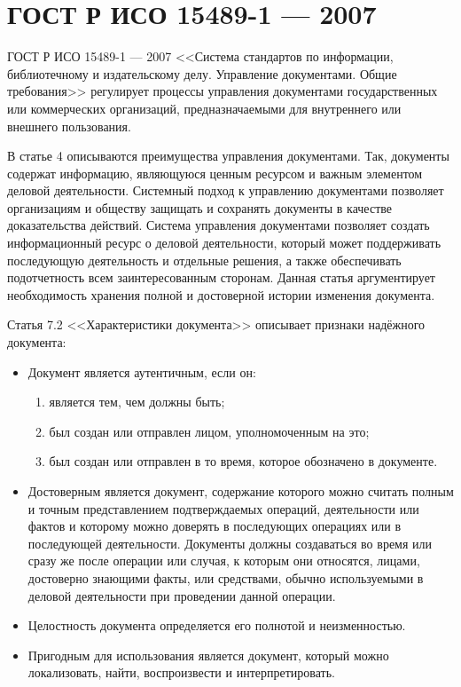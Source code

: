 \section{ГОСТ Р ИСО 15489-1 --- 2007} \label{rights_gost_15489-1}

ГОСТ Р ИСО 15489-1 --- 2007 <<Система стандартов по информации, библиотечному и издательскому делу. Управление документами. Общие требования>> регулирует процессы управления документами государственных или коммерческих организаций, предназначаемыми для внутреннего или внешнего пользования.

В статье 4 описываются преимущества управления документами. Так, документы содержат информацию, являющуюся ценным ресурсом и важным элементом деловой деятельности. Системный подход к управлению документами позволяет организациям и обществу защищать и сохранять документы в качестве доказательства действий. Система управления документами позволяет создать информационный ресурс о деловой деятельности, который может поддерживать последующую деятельность и отдельные решения, а также обеспечивать подотчетность всем заинтересованным сторонам. Данная статья аргументирует необходимость хранения полной и достоверной истории изменения документа.

Статья 7.2 <<Характеристики документа>> описывает признаки надёжного документа:
\begin{itemize}
	\item Документ является аутентичным, если он:
	\begin{enumerate}
	\item является тем, чем должны быть;
	\item был создан или отправлен лицом, уполномоченным на это;
	\item был создан или отправлен в то время, которое обозначено в документе.
	\end{enumerate}
	\item Достоверным является документ, содержание которого можно считать полным и точным представлением подтверждаемых операций, деятельности или фактов и которому можно доверять в последующих операциях или в последующей деятельности. Документы должны создаваться во время или сразу же после операции или случая, к которым они относятся, лицами, достоверно знающими факты, или средствами, обычно используемыми в деловой деятельности при проведении данной операции.
	\item Целостность документа определяется его полнотой и неизменностью.
	\item Пригодным для использования является документ, который можно локализовать, найти, воспроизвести и интерпретировать.
\end{itemize}